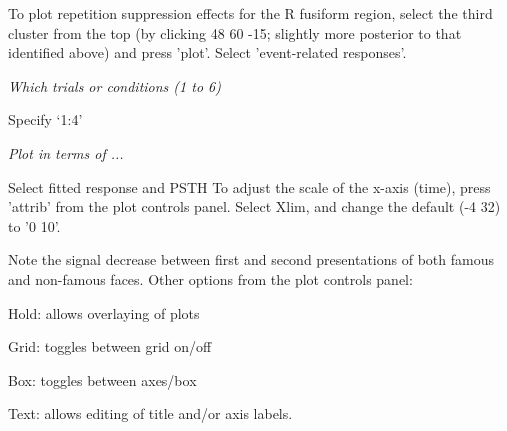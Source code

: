 To plot repetition suppression effects for the R fusiform region, select the third cluster from the top (by clicking 48 60 -15; slightly more posterior to that identified above) and press 'plot'.
Select  'event-related responses'.
\bi
\item{\em Which trials or conditions (1 to 6)}
\item{Specify `1:4'}
\item{\em Plot in terms of ...}
\item{Select fitted response and PSTH}
\ei
To adjust the scale of the x-axis (time), press 'attrib' from the plot controls panel.
Select Xlim, and change the default (-4 32) to '0 10'.

Note the signal decrease between first and second presentations of both famous and non-famous faces.
Other options from the plot controls panel:
\bi
\item{Hold: allows overlaying of plots}
\item{Grid: toggles between grid on/off}
\item{Box: toggles between axes/box}
\item{Text: allows editing of title and/or axis labels.}
\ei